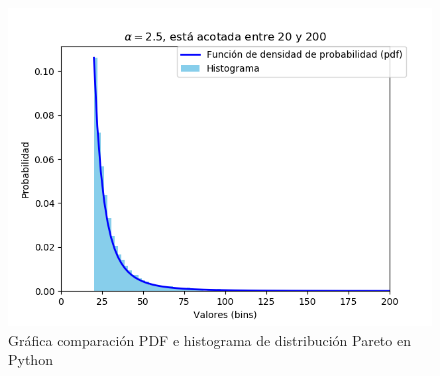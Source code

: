 \begin{figure}[th]
    \centering
    \includegraphics[scale=.7]{Figures/ParetoDIstribution}
    \decoRule
    \caption[Gráfica comparación PDF e histograma de distribución Pareto en Python]{Gráfica comparación PDF e histograma de distribución Pareto en Python}
    \label{fig:generacionPareto}
\end{figure}

